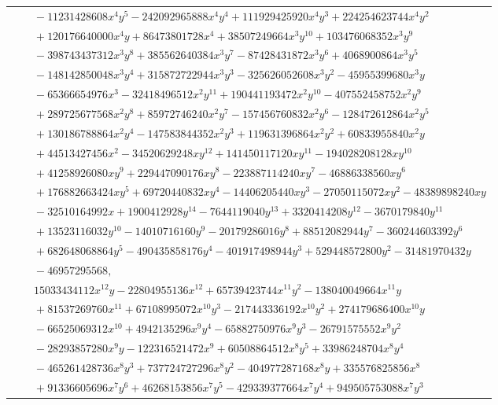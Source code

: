 \documentclass[11pt]{article}
\begin{document}
\begin{longtable}{@{}ll@{}}
 & $\quad -11231428608x^{4}y^{5}-242092965888x^{4}y^{4}+111929425920x^{4}y^{3}+224254623744x^{4}y^{2}$\\
 & $\quad +120176640000x^{4}y+86473801728x^{4}+38507249664x^{3}y^{10}+103476068352x^{3}y^{9}$\\
 & $\quad -398743437312x^{3}y^{8}+385562640384x^{3}y^{7}-87428431872x^{3}y^{6}+4068900864x^{3}y^{5}$\\
 & $\quad -148142850048x^{3}y^{4}+315872722944x^{3}y^{3}-325626052608x^{3}y^{2}-45955399680x^{3}y$\\
 & $\quad -65366654976x^{3}-32418496512x^{2}y^{11}+190441193472x^{2}y^{10}-407552458752x^{2}y^{9}$\\
 & $\quad +289725677568x^{2}y^{8}+85972746240x^{2}y^{7}-157456760832x^{2}y^{6}-128472612864x^{2}y^{5}$\\
 & $\quad +130186788864x^{2}y^{4}-147583844352x^{2}y^{3}+119631396864x^{2}y^{2}+60833955840x^{2}y$\\
 & $\quad +44513427456x^{2}-34520629248xy^{12}+141450117120xy^{11}-194028208128xy^{10}$\\
 & $\quad +41258926080xy^{9}+229447090176xy^{8}-223887114240xy^{7}-46886338560xy^{6}$\\
 & $\quad +176882663424xy^{5}+69720440832xy^{4}-14406205440xy^{3}-27050115072xy^{2}-48389898240xy$\\
 & $\quad -32510164992x+1900412928y^{14}-7644119040y^{13}+3320414208y^{12}-3670179840y^{11}$\\
 & $\quad +13523116032y^{10}-14010716160y^{9}-20179286016y^{8}+88512082944y^{7}-360244603392y^{6}$\\
 & $\quad +682648068864y^{5}-490435858176y^{4}-401917498944y^{3}+529448572800y^{2}-31481970432y$\\
 & $\quad -46957295568,$\\
 & $\quad 15033434112x^{12}y-22804955136x^{12}+65739423744x^{11}y^{2}-138040049664x^{11}y$\\
 & $\quad +81537269760x^{11}+67108995072x^{10}y^{3}-217443336192x^{10}y^{2}+274179686400x^{10}y$\\
 & $\quad -66525069312x^{10}+4942135296x^{9}y^{4}-65882750976x^{9}y^{3}-26791575552x^{9}y^{2}$\\
 & $\quad -28293857280x^{9}y-122316521472x^{9}+60508864512x^{8}y^{5}+33986248704x^{8}y^{4}$\\
 & $\quad -465261428736x^{8}y^{3}+737724727296x^{8}y^{2}-404977287168x^{8}y+335576825856x^{8}$\\
 & $\quad +91336605696x^{7}y^{6}+46268153856x^{7}y^{5}-429339377664x^{7}y^{4}+949505753088x^{7}y^{3}$\\

\end{longtable}
\end{document}
